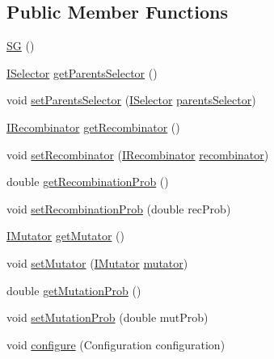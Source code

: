 \subsection*{Public Member Functions}
\begin{DoxyCompactItemize}
\item 
\hyperlink{classnet_1_1sf_1_1jclec_1_1algorithm_1_1classic_1_1_s_g_af975d077dd0ec41552f25618d2bd503d}{S\-G} ()
\item 
\hyperlink{interfacenet_1_1sf_1_1jclec_1_1_i_selector}{I\-Selector} \hyperlink{classnet_1_1sf_1_1jclec_1_1algorithm_1_1classic_1_1_s_g_abdd8706c3762626958af1a937041ad70}{get\-Parents\-Selector} ()
\item 
void \hyperlink{classnet_1_1sf_1_1jclec_1_1algorithm_1_1classic_1_1_s_g_ad624a00e7ca0a60ebfb2a8e2051e5586}{set\-Parents\-Selector} (\hyperlink{interfacenet_1_1sf_1_1jclec_1_1_i_selector}{I\-Selector} \hyperlink{classnet_1_1sf_1_1jclec_1_1algorithm_1_1classic_1_1_s_g_aeb8173ace1e16d89028b97678822f603}{parents\-Selector})
\item 
\hyperlink{interfacenet_1_1sf_1_1jclec_1_1_i_recombinator}{I\-Recombinator} \hyperlink{classnet_1_1sf_1_1jclec_1_1algorithm_1_1classic_1_1_s_g_ad98f758800e6e5b3cbc78b116d868c3a}{get\-Recombinator} ()
\item 
void \hyperlink{classnet_1_1sf_1_1jclec_1_1algorithm_1_1classic_1_1_s_g_a2c7524223f1cf4731abecf6a393dd38a}{set\-Recombinator} (\hyperlink{interfacenet_1_1sf_1_1jclec_1_1_i_recombinator}{I\-Recombinator} \hyperlink{classnet_1_1sf_1_1jclec_1_1algorithm_1_1classic_1_1_s_g_a64b6a952a98acd9193bcb32852b84250}{recombinator})
\item 
double \hyperlink{classnet_1_1sf_1_1jclec_1_1algorithm_1_1classic_1_1_s_g_a5f43744813a260fb8337c253c6ef80ad}{get\-Recombination\-Prob} ()
\item 
void \hyperlink{classnet_1_1sf_1_1jclec_1_1algorithm_1_1classic_1_1_s_g_a0948c686fa64ed01adbc10c0585f7bfe}{set\-Recombination\-Prob} (double rec\-Prob)
\item 
\hyperlink{interfacenet_1_1sf_1_1jclec_1_1_i_mutator}{I\-Mutator} \hyperlink{classnet_1_1sf_1_1jclec_1_1algorithm_1_1classic_1_1_s_g_a8bf4ddadac62d4bf350a8589600771ba}{get\-Mutator} ()
\item 
void \hyperlink{classnet_1_1sf_1_1jclec_1_1algorithm_1_1classic_1_1_s_g_a4b31d1ee864a5c18c956de2c7c6a9c3e}{set\-Mutator} (\hyperlink{interfacenet_1_1sf_1_1jclec_1_1_i_mutator}{I\-Mutator} \hyperlink{classnet_1_1sf_1_1jclec_1_1algorithm_1_1classic_1_1_s_g_a09ed262ead4acffefd99566fbe645184}{mutator})
\item 
double \hyperlink{classnet_1_1sf_1_1jclec_1_1algorithm_1_1classic_1_1_s_g_ac1ceae1d14f8a0f4bdff23734bf80087}{get\-Mutation\-Prob} ()
\item 
void \hyperlink{classnet_1_1sf_1_1jclec_1_1algorithm_1_1classic_1_1_s_g_a0773924d38e7713b3b4fbe42fa957db1}{set\-Mutation\-Prob} (double mut\-Prob)
\item 
void \hyperlink{classnet_1_1sf_1_1jclec_1_1algorithm_1_1classic_1_1_s_g_a38e1f1a01fbb20d388c234a32ab3542d}{configure} (Configuration configuration)
\end{DoxyCompactItemize}

